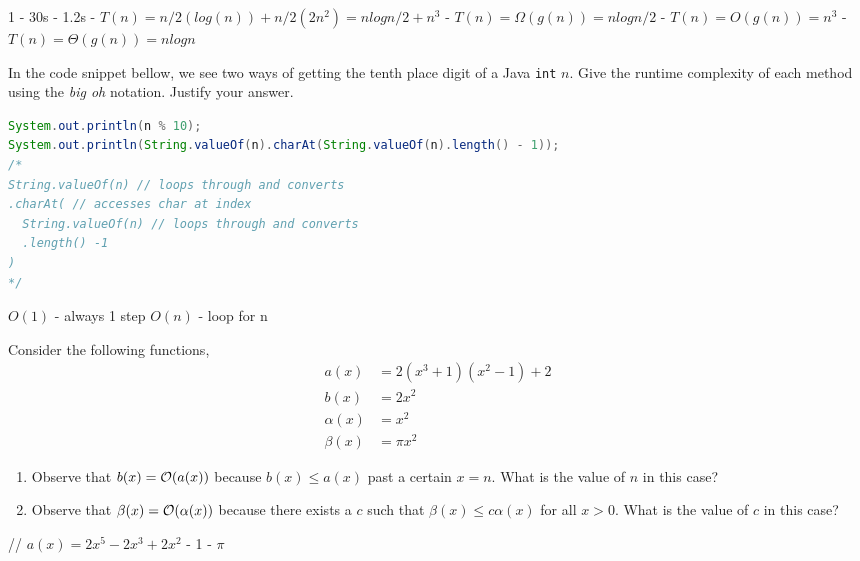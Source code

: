 \documentclass{homework}
\begin{document}
\begin{sol}
  1 - 30s  - 1.2s  - $T(n) = n/2(log(n)) + n/2(2n^2) = nlogn/2 + n^3$  - $T(n) = \Omega(g(n)) = nlogn/2$  - $T(n) = O(g(n)) = n^3$  - $T(n) = \Theta(g(n)) = nlogn$
\end{sol}

\question In the code snippet bellow, we see two ways of getting the tenth
place digit of a Java \texttt{int} $n$. Give the runtime
complexity of each method using the \textit{big oh} notation.
Justify your answer.
\begin{lstlisting}[language=java]
System.out.println(n % 10);
System.out.println(String.valueOf(n).charAt(String.valueOf(n).length() - 1));
/*
String.valueOf(n) // loops through and converts
.charAt( // accesses char at index
  String.valueOf(n) // loops through and converts
  .length() -1 
)
*/
\end{lstlisting}


\begin{sol}
  $O(1)$ - always 1 step \smallbreak
  $O(n)$ - loop for n
\end{sol}

\question Consider the following functions,
\begin{align*}
  a(x)      & = 2(x^3+1)(x^2-1)+2 \\
  b(x)      & = 2x^2              \\
  \alpha(x) & = x^2               \\
  \beta(x)  & = \pi x^2
\end{align*}
\begin{enumerate}
  \item Observe that $b(x) = \mathcal{O}(a(x))$ because $b(x) \leq a(x)$ past a
        certain $x=n$. What is the value of $n$ in this case?


  \item Observe that $\beta(x) = \mathcal{O}(\alpha(x))$ because there exists a $c$
        such that $\beta(x) \leq c\alpha(x)$ for all $x > 0$. What is the
        value of $c$ in this case?


\end{enumerate}

\begin{sol}
  // $a(x)=2x^{5} - 2x^{3} + 2x^{2}$  - 1  - $\pi$
\end{sol}
\end{document}
